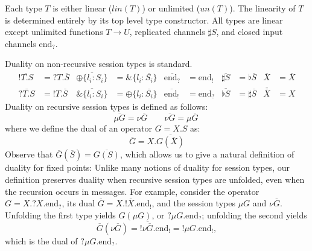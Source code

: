\documentclass[orivec,envcountsame]{llncs}
\newcommand{\with}{\mathbin\binampersand}
\newcommand{\gvdual}[1]{\overline{#1}}
\newcommand{\gvout}[2]{{!#1.#2}}
\newcommand{\gvin}[2]{{?#1.#2}}
\newcommand{\uto}{\ensuremath{\rightarrow}}
\newcommand{\outterm}{\mathrm{end}_!}
\newcommand{\interm}{\mathrm{end}_?}
\newcommand{\gvserver}[1]{\flat #1}
\newcommand{\gvservice}[1]{\sharp #1}
\newcommand{\un}{un}
\newcommand{\lin}{lin}
\begin{document}
Each type $T$ is either linear ($\lin(T)$) or unlimited ($\un(T)$). The linearity of $T$ is
determined entirely by its top level type constructor.
%
All types are linear except unlimited functions $T \uto U$, replicated channels $\gvservice{S}$, and
closed input channels $\interm$.

Duality on non-recursive session types is standard.
{\small\begin{align*}
\gvdual{\gvout{T}{S}} &= \gvin{T}{\gvdual{S}} &
  \gvdual{\oplus \{ l_i: S_i \}} &= \with \{ l_i : \gvdual{S_i} \} &
  \gvdual{\interm} &= \outterm &
  \gvdual{\gvservice{S}} &= \gvserver{\gvdual{S}} &
  \gvdual{X} &= \gvdual{X} \\
\gvdual{\gvin{T}{S}} &= \gvout{T}{\gvdual{S}} &
  \gvdual{\with \{ l_i: S_i \}} &= \oplus \{ l_i : \gvdual{S_i} \} &
  \gvdual{\outterm} &= \interm &
  \gvdual{\gvserver{S}} &= \gvservice{\gvdual{S}} &
  \gvdual{\gvdual{X}} &= X
\end{align*}}%
%
Duality on recursive session types is defined as follows:
\[
\gvdual{\mu G} = \nu \gvdual{G} \qquad \gvdual{\nu G} = \mu \gvdual{G} \
\]%
where we define the dual of an operator $G = X.S$ as:
\[
\gvdual{G} = X.\gvdual{G(\gvdual{X})}
\]%
%
Observe that $\gvdual{G}(\gvdual{S}) = \gvdual{G(S)}$, which allows us to
give a natural definition of duality for fixed points:
%
Unlike many notions of duality for session types, our definition preserves duality when recursive
session types are unfolded, even when the recursion occurs in messages.  For example, consider the
operator $G = X.\gvin{X}{\interm}$, its dual $\gvdual{G} = X.\gvout{\gvdual{X}}{\outterm}$, and the
session types $\mu G$ and $\nu \gvdual{G}$.  Unfolding the first type yields $G(\mu G)$, or
$\gvin{\mu G}{\interm}$; unfolding the second yields {\small\[ \gvdual{G}(\nu \gvdual{G}) =
  \gvout{\gvdual{\nu \gvdual{G}}}{\outterm} = \gvout{\mu G}{\outterm},
\]}%
which is the dual of $\gvin{\mu G}{\interm}$.
\end{document}
